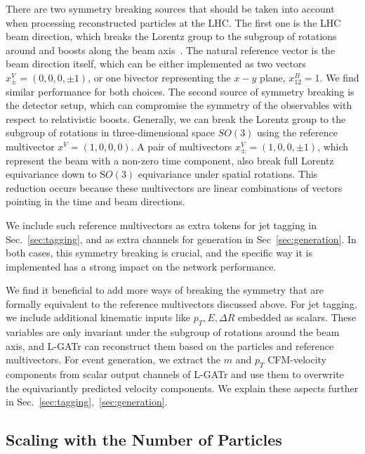 \documentclass[submission, Phys]{SciPost}
\begin{document}
There are two symmetry breaking sources that should be taken into account when processing reconstructed particles at the LHC. The first one is the LHC beam direction, which breaks the Lorentz group to the subgroup of rotations around and boosts along the beam axis~\cite{Maitre:2024hzp,Bogatskiy:2023nnw, ruhe2023clifford, Gong:2022lye}. The natural reference vector is the beam direction itself, which can be either implemented as two vectors $x^V_\pm = (0,0,0,\pm 1)$, or one bivector representing the $x-y$ plane, $x^B_{12} = 1$. We find similar performance for both choices. The second source of symmetry breaking is the detector setup, which can compromise the symmetry of the observables with respect to relativistic boosts. Generally, we can break the Lorentz group to the subgroup of rotations in three-dimensional space $SO(3)$ using the reference multivector $x^V = (1,0,0,0)$. A pair of multivectors $x^V_\pm = (1,0,0,\pm 1)$, which represent the beam with a non-zero time component, also break full Lorentz equivariance down to $\mathrm SO(3)$ equivariance under spatial rotations. This reduction occurs because these multivectors are linear combinations of vectors pointing in the time and beam directions.

We include such reference multivectors as extra tokens for jet tagging in Sec.~\ref{sec:tagging}, and as extra channels for generation in Sec~\ref{sec:generation}. In both cases, this symmetry breaking is crucial, and the specific way it is implemented has a strong impact on the network performance.

We find it beneficial to add more ways of breaking the symmetry that are formally equivalent to the reference multivectors discussed above. For jet tagging, we include additional kinematic inputs like $p_T, E, \Delta R$ embedded as scalars. These variables are only invariant under the subgroup of rotations around the beam axis, and L-GATr can reconstruct them based on the particles and reference multivectors. For event generation, we extract the $m$ and $p_T$ CFM-velocity components from scalar output channels of L-GATr and use them to overwrite the equivariantly predicted velocity components. We explain these aspects further in Sec.~\ref{sec:tagging},~\ref{sec:generation}.

\subsection{Scaling with the Number of Particles}
\end{document}
